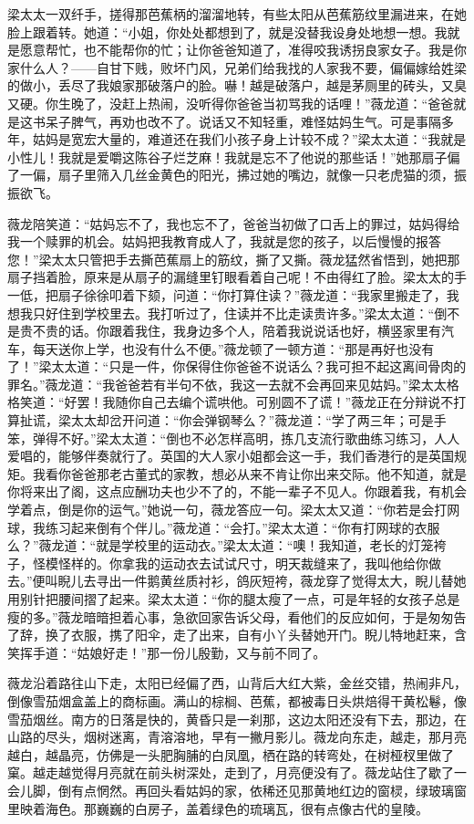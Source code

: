 \par 梁太太一双纤手，搓得那芭蕉柄的溜溜地转，有些太阳从芭蕉筋纹里漏进来，在她脸上跟着转。她道：“小姐，你处处都想到了，就是没替我设身处地想一想。我就是愿意帮忙，也不能帮你的忙；让你爸爸知道了，准得咬我诱拐良家女子。我是你家什么人？——自甘下贱，败坏门风，兄弟们给我找的人家我不要，偏偏嫁给姓梁的做小，丢尽了我娘家那破落户的脸。嚇！越是破落户，越是茅厕里的砖头，又臭又硬。你生晚了，没赶上热闹，没听得你爸爸当初骂我的话哩！”薇龙道：“爸爸就是这书呆子脾气，再劝也改不了。说话又不知轻重，难怪姑妈生气。可是事隔多年，姑妈是宽宏大量的，难道还在我们小孩子身上计较不成？”梁太太道：“我就是小性儿！我就是爱嚼这陈谷子烂芝麻！我就是忘不了他说的那些话！”她那扇子偏了一偏，扇子里筛入几丝金黄色的阳光，拂过她的嘴边，就像一只老虎猫的须，振振欲飞。
\par 薇龙陪笑道：“姑妈忘不了，我也忘不了，爸爸当初做了口舌上的罪过，姑妈得给我一个赎罪的机会。姑妈把我教育成人了，我就是您的孩子，以后慢慢的报答您！”梁太太只管把手去撕芭蕉扇上的筋纹，撕了又撕。薇龙猛然省悟到，她把那扇子挡着脸，原来是从扇子的漏缝里钉眼看着自己呢！不由得红了脸。梁太太的手一低，把扇子徐徐叩着下颏，问道：“你打算住读？”薇龙道：“我家里搬走了，我想我只好住到学校里去。我打听过了，住读并不比走读贵许多。”梁太太道：“倒不是贵不贵的话。你跟着我住，我身边多个人，陪着我说说话也好，横竖家里有汽车，每天送你上学，也没有什么不便。”薇龙顿了一顿方道：“那是再好也没有了！”梁太太道：“只是一件，你保得住你爸爸不说话么？我可担不起这离间骨肉的罪名。”薇龙道：“我爸爸若有半句不依，我这一去就不会再回来见姑妈。”梁太太格格笑道：“好罢！我随你自己去编个谎哄他。可别圆不了谎！”薇龙正在分辩说不打算扯谎，梁太太却岔开问道：“你会弹钢琴么？”薇龙道：“学了两三年；可是手笨，弹得不好。”梁太太道：“倒也不必怎样高明，拣几支流行歌曲练习练习，人人爱唱的，能够伴奏就行了。英国的大人家小姐都会这一手，我们香港行的是英国规矩。我看你爸爸那老古董式的家教，想必从来不肯让你出来交际。他不知道，就是你将来出了阁，这点应酬功夫也少不了的，不能一辈子不见人。你跟着我，有机会学着点，倒是你的运气。”她说一句，薇龙答应一句。梁太太又道：“你若是会打网球，我练习起来倒有个伴儿。”薇龙道：“会打。”梁太太道：“你有打网球的衣服么？”薇龙道：“就是学校里的运动衣。”梁太太道：“噢！我知道，老长的灯笼袴子，怪模怪样的。你拿我的运动衣去试试尺寸，明天裁缝来了，我叫他给你做去。”便叫睨儿去寻出一件鹅黄丝质衬衫，鸽灰短袴，薇龙穿了觉得太大，睨儿替她用别针把腰间摺了起来。梁太太道：“你的腿太瘦了一点，可是年轻的女孩子总是瘦的多。”薇龙暗暗担着心事，急欲回家告诉父母，看他们的反应如何，于是匆匆告了辞，换了衣服，携了阳伞，走了出来，自有小丫头替她开门。睨儿特地赶来，含笑挥手道：“姑娘好走！”那一份儿殷勤，又与前不同了。
\par 薇龙沿着路往山下走，太阳已经偏了西，山背后大红大紫，金丝交错，热闹非凡，倒像雪茄烟盒盖上的商标画。满山的棕榈、芭蕉，都被毒日头烘焙得干黄松鬈，像雪茄烟丝。南方的日落是快的，黄昏只是一刹那，这边太阳还没有下去，那边，在山路的尽头，烟树迷离，青溶溶地，早有一撇月影儿。薇龙向东走，越走，那月亮越白，越晶亮，仿佛是一头肥胸脯的白凤凰，栖在路的转弯处，在树桠杈里做了窠。越走越觉得月亮就在前头树深处，走到了，月亮便没有了。薇龙站住了歇了一会儿脚，倒有点惘然。再回头看姑妈的家，依稀还见那黄地红边的窗棂，绿玻璃窗里映着海色。那巍巍的白房子，盖着绿色的琉璃瓦，很有点像古代的皇陵。
